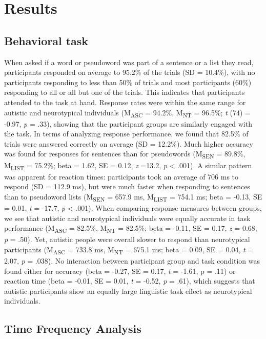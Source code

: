 \section{Results}
\subsection{Behavioral task}
When asked if a word or pseudoword was part of a sentence or a list they read, participants responded on average to 95.2\% of the trials (SD = 10.4\%), with no participants responding to less than 50\% of trials and most participants (60\%) responding to all or all but one of the trials. This indicates that participants attended to the task at hand. Response rates were within the same range for autistic and neurotypical individuals (M\textsubscript{ASC} = 94.2\%,  M\textsubscript{NT} = 96.5\%; \textit{t} (74) = -0.97, \textit{p} = .33), showing that the participant groups are similarly engaged with the task. In terms of analyzing response performance, we found that 82.5\% of trials were answered correctly on average (SD = 12.2\%). Much higher accuracy was found for responses for sentences than for pseudowords (M\textsubscript{SEN} = 89.8\%,  M\textsubscript{LIST} = 75.2\%; beta = 1.62, SE = 0.12, \textit{z} =13.2, \textit{p} <  .001). A similar pattern was apparent for reaction times: participants took an average of 706 ms to respond (SD = 112.9 ms), but were much faster when responding to sentences than to pseudoword lists (M\textsubscript{SEN} = 657.9 ms,  M\textsubscript{LIST} = 754.1 ms; beta =  -0.13, SE = 0.01, \textit{t} = -17.7, \textit{p} <  .001). When comparing response measures between groups, we see that autistic and neurotypical individuals were equally accurate in task performance  (M\textsubscript{ASC} = 82.5\%,  M\textsubscript{NT} = 82.5\%; beta = -0.11, SE = 0.17, \textit{z} =-0.68, \textit{p} = .50). Yet, autistic people were overall slower to respond than neurotypical participants (M\textsubscript{ASC} = 733.8 ms,  M\textsubscript{NT} = 675.1 ms; beta = 0.09, SE = 0.04, \textit{t} = 2.07, \textit{p} = .038). No interaction between participant group and task condition was found either for accuracy (beta = -0.27, SE = 0.17, \textit{t} = -1.61, p  = .11) or reaction time (beta = -0.01, SE = 0.01, \textit{t} = -0.52, \textit{p} = .61), which suggests that autistic participants show an equally large linguistic task effect as neurotypical individuals.


\subsection{Time Frequency Analysis}
